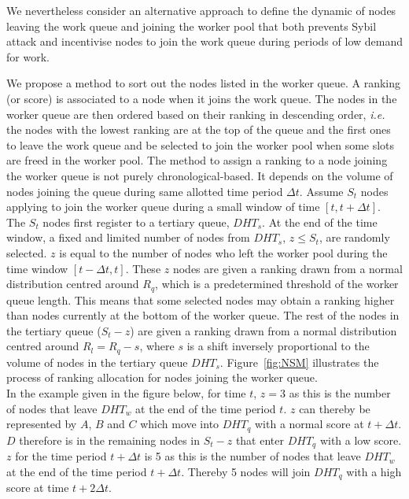 \documentclass[a4paper, 12pt]{book}
\begin{document}
We nevertheless consider an alternative approach to define the dynamic of nodes leaving the work queue and joining the worker pool that both prevents Sybil attack and incentivise nodes to join the work queue during periods of low demand for work.

We propose a method to sort out the nodes listed in the worker queue. A ranking (or score) is associated to a node when it joins the work queue. The nodes in the worker queue are then ordered based on their ranking in descending order, \textit{i.e.} the nodes with the lowest ranking are at the top of the queue and the first ones to leave the work queue and be selected to join the worker pool when some slots are freed in the worker pool. The method to assign a ranking to a node joining the worker queue is not purely chronological-based. It depends on the volume of nodes joining the queue during same allotted time period $\Delta t$. Assume $S_t$ nodes applying to join the worker queue during a small window of time $[t, t+\Delta t]$. The $S_t$ nodes first register to a tertiary queue, $DHT_s$. At the end of the time window, a fixed and limited number of nodes from $DHT_s$, $z \leq S_t$, are randomly selected. $z$ is equal to the number of nodes who left the worker pool during the time window  $[t-\Delta t, t]$. These $z$ nodes are given a ranking drawn from a normal distribution centred around $R_q$, which is a predetermined threshold of the worker queue length. This means that some selected nodes may obtain a ranking higher than nodes currently at the bottom of the worker queue. The rest of the nodes in the tertiary queue ($S_t-z$) are given a ranking drawn from a normal distribution centred around $R_l = R_q - s$, where $s$ is a shift inversely proportional to the volume of nodes in the tertiary queue $DHT_s$. Figure~\ref{fig:NSM} illustrates the process of ranking allocation for nodes joining the worker queue. \\

In the example given in the figure below, for time $t$, $z = 3$ as this is the number of nodes that leave $DHT_w$ at the end of the time period $t$. $z$ can thereby be represented by $A$, $B$ and $C$ which move into $DHT_q$ with a normal score at $t + \Delta t$. $D$ therefore is in the remaining nodes in $S_t - z$ that enter $DHT_q$ with a low score. $z$ for the time period $t + \Delta t$ is 5 as this is the number of nodes that leave $DHT_w$ at the end of the time period $t + \Delta t$. Thereby 5 nodes will join $DHT_q$ with a high score at time $t + 2\Delta t$.
\end{document}
